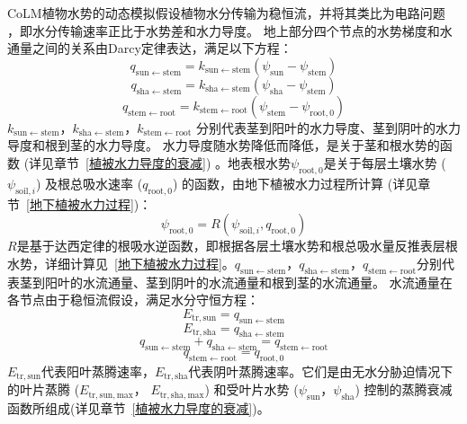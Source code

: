 CoLM植物水势的动态模拟假设植物水分传输为稳恒流，并将其类比为电路问题~
\citep{van1948water}，即水分传输速率正比于水势差和水力导度。
地上部分四个节点的水势梯度和水通量之间的关系由Darcy定律表达，满足以下方程：
\begin{equation}\label{q_sunstem}
  q_{\mathrm{ {sun \leftarrow stem }}}=k_{\mathrm{{sun} \leftarrow  {stem}}}\left(\psi_{\mathrm{sun}}-\psi_{\mathrm{stem}}\right)
\end{equation}
\begin{equation}
  q_{\mathrm{ {sha \leftarrow stem }}}=k_{\mathrm{ {sha} \leftarrow {stem}}}\left(\psi_{\mathrm{sha}}-\psi_{\mathrm{ {stem }}}\right)
\end{equation}
\begin{equation}
  q_{\mathrm{ {stem \leftarrow root }}}=k_{\mathrm{ {stem } \leftarrow  { root }}}\left(\psi_{\mathrm{ {stem }}}-\psi_{\mathrm{ {root }}, 0}\right)
\end{equation}
$k_{\mathrm{sun \leftarrow stem}}$，$k_{\mathrm{sha \leftarrow stem }}$，$k_{\mathrm{stem \leftarrow root }}$ 分别代表茎到阳叶的水力导度、茎到阴叶的水力导度和根到茎的水力导度。
水力导度随水势降低而降低，是关于茎和根水势的函数 (详见章节~\ref{植被水力导度的衰减}) 。地表根水势$\psi_{\mathrm{root,0}}$是关于每层土壤水势 ($\psi_{\mathrm{soil},i}$)
及根总吸水速率 ($q_{\mathrm{root,0}}$) 的函数，由地下植被水力过程所计算 (详见章节~\ref{地下植被水力过程})：
\begin{equation}\label{Psi_root_0}
  \psi_{\mathrm{root, 0}}=R\left(\psi_{\mathrm{ {soil }}, i}, q_{\mathrm{root, 0}}\right)
\end{equation}
$R$是基于达西定律的根吸水逆函数，即根据各层土壤水势和根总吸水量反推表层根水势，详细计算见~\ref{地下植被水力过程}。$q_{\mathrm{sun \leftarrow stem}}$，$q_{\mathrm{sha \leftarrow stem }}$，$q_{\mathrm{stem \leftarrow root }}$分别代表茎到阳叶的水流通量、茎到阴叶的水流通量和根到茎的水流通量。
水流通量在各节点由于稳恒流假设，满足水分守恒方程：
\begin{equation}
  E_{\mathrm{tr,sun}}=q_{\mathrm{sun \leftarrow  stem}}
\end{equation}
\begin{equation}
  E_{\mathrm{tr, {sha }}}=q_{\mathrm{ sha \leftarrow stem}}
\end{equation}
\begin{equation}
  q_{\mathrm{ {sun \leftarrow stem }}}+q_{\mathrm{ {sha \leftarrow stem }}}=q_{\mathrm{ {stem \leftarrow root }}}
\end{equation}
\begin{equation}\label{q_stemroot}
  q_{\mathrm{stem \leftarrow root}}=q_{\mathrm{root, 0}}
\end{equation}
$E_{\mathrm{tr,sun}}$代表阳叶蒸腾速率，$E_{\mathrm{tr,sha}}$代表阴叶蒸腾速率。它们是由无水分胁迫情况下的叶片蒸腾 ($E_{\mathrm{tr,sun,max}}$， $E_{\mathrm{tr,sha,max}}$)
和受叶片水势 ($\psi_{\mathrm{sun}}$，$\psi_{\mathrm{sha}}$) 控制的蒸腾衰减函数所组成(详见章节~\ref{植被水力导度的衰减})。


